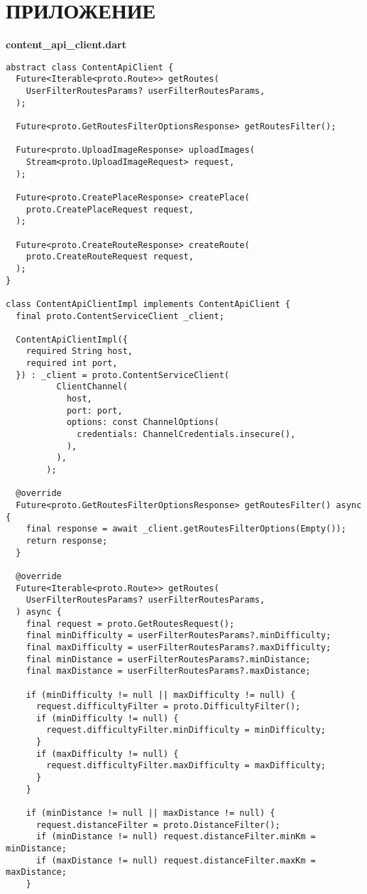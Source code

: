 \section{ПРИЛОЖЕНИЕ}
\textbf{content\_api\_client.dart}
\begin{verbatim}
abstract class ContentApiClient {
  Future<Iterable<proto.Route>> getRoutes(
    UserFilterRoutesParams? userFilterRoutesParams,
  );

  Future<proto.GetRoutesFilterOptionsResponse> getRoutesFilter();

  Future<proto.UploadImageResponse> uploadImages(
    Stream<proto.UploadImageRequest> request,
  );

  Future<proto.CreatePlaceResponse> createPlace(
    proto.CreatePlaceRequest request,
  );

  Future<proto.CreateRouteResponse> createRoute(
    proto.CreateRouteRequest request,
  );
}

class ContentApiClientImpl implements ContentApiClient {
  final proto.ContentServiceClient _client;

  ContentApiClientImpl({
    required String host,
    required int port,
  }) : _client = proto.ContentServiceClient(
          ClientChannel(
            host,
            port: port,
            options: const ChannelOptions(
              credentials: ChannelCredentials.insecure(),
            ),
          ),
        );

  @override
  Future<proto.GetRoutesFilterOptionsResponse> getRoutesFilter() async {
    final response = await _client.getRoutesFilterOptions(Empty());
    return response;
  }

  @override
  Future<Iterable<proto.Route>> getRoutes(
    UserFilterRoutesParams? userFilterRoutesParams,
  ) async {
    final request = proto.GetRoutesRequest();
    final minDifficulty = userFilterRoutesParams?.minDifficulty;
    final maxDifficulty = userFilterRoutesParams?.maxDifficulty;
    final minDistance = userFilterRoutesParams?.minDistance;
    final maxDistance = userFilterRoutesParams?.maxDistance;

    if (minDifficulty != null || maxDifficulty != null) {
      request.difficultyFilter = proto.DifficultyFilter();
      if (minDifficulty != null) {
        request.difficultyFilter.minDifficulty = minDifficulty;
      }
      if (maxDifficulty != null) {
        request.difficultyFilter.maxDifficulty = maxDifficulty;
      }
    }

    if (minDistance != null || maxDistance != null) {
      request.distanceFilter = proto.DistanceFilter();
      if (minDistance != null) request.distanceFilter.minKm = minDistance;
      if (maxDistance != null) request.distanceFilter.maxKm = maxDistance;
    }


\end{verbatim}
